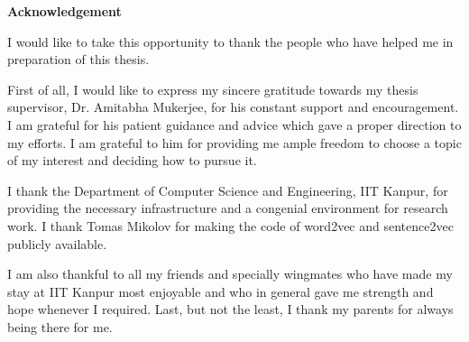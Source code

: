 \cleardoublepage

\begin{center}
	{\huge{\textbf{Acknowledgement}}}
\end{center}

I would like to take this opportunity to thank the people who have helped me in preparation of this thesis.

First of all, I would like to express my sincere gratitude towards my thesis supervisor, Dr. Amitabha Mukerjee, for his  constant support and encouragement. I am grateful for his patient guidance and advice which gave a proper direction to my efforts. I am grateful to him for providing me ample freedom to choose a topic of my interest and deciding how to pursue it.

I thank the Department of Computer Science and Engineering, IIT Kanpur, for providing the necessary infrastructure and a congenial environment for research work. I thank Tomas Mikolov for making the code of word2vec and sentence2vec publicly available.

I am also thankful to all my friends and specially wingmates who have made my stay at IIT Kanpur most enjoyable and who in general gave me strength and hope whenever I required.
Last, but not the least, I thank my parents for always being there for me.

\vskip 4mm
\begin{flushright}
\textit{\textbf{\author}}
\end{flushright}
